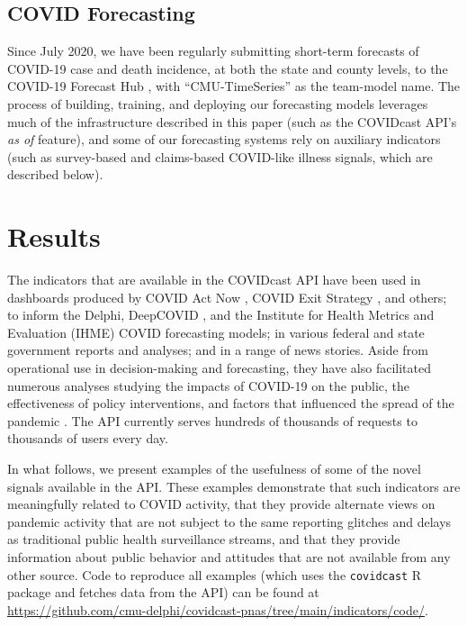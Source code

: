 \documentclass[9pt,twocolumn,twoside,lineno]{pnas-new}
\begin{document}
\subsection{COVID Forecasting}

Since July 2020, we have been regularly submitting short-term forecasts of
COVID-19 case and death incidence, at both the state and county levels, to the 
COVID-19 Forecast Hub \cite{ForecastHub}, with ``CMU-TimeSeries'' as the
team-model name.  The process of building, training, and deploying our
forecasting models leverages much of the infrastructure described in this paper
(such as the COVIDcast API's \textit{as of} feature), and some of our
forecasting systems rely on auxiliary indicators (such as survey-based and
claims-based COVID-like illness signals, which are described below).

\section{Results}

The indicators that are available in the COVIDcast API have been used in
dashboards produced by COVID Act Now \cite{CovidActNow}, COVID Exit Strategy
\cite{CovidExitStrategy}, and others; to inform the Delphi, DeepCOVID
\cite{Rodriguez:2021}, and the Institute for Health Metrics and Evaluation
(IHME) \cite{IHMEProj} COVID forecasting models; in various federal and state
government reports and analyses; and in a range of news stories. Aside from
operational use in decision-making and forecasting, they have also facilitated
numerous analyses studying the impacts of COVID-19 on the public, the
effectiveness of policy interventions, and factors that influenced the spread of
the pandemic \cite{Adjodah:2021, Pierri:2021, Jewell:2021, Chakrabarti:2020,
  Doerr:2021, Rebeiro:2021}. The API currently serves hundreds of thousands of
requests to thousands of users every day.

In what follows, we present examples of the usefulness of some of the novel
signals available in the API. These examples demonstrate that such indicators
are meaningfully related to COVID activity, that they provide alternate views on
pandemic activity that are not subject to the same reporting glitches and delays
as traditional public health surveillance streams, and that they provide
information about public behavior and attitudes that are not available from any
other source. Code to reproduce all examples (which uses the \texttt{covidcast}
R package and fetches data from the API) can be found at
\url{https://github.com/cmu-delphi/covidcast-pnas/tree/main/indicators/code/}.
\end{document}
